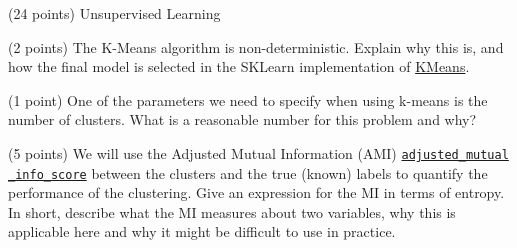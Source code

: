\documentclass[12pt]{article}
\begin{document}

\begin{question}{\label{Q_UNSUP_LEARN}(24 points) Unsupervised Learning}




\begin{subquestion}{(2 points) The K-Means algorithm is non-deterministic. Explain why this is, and how the final model is selected in the SKLearn implementation of \href{https://scikit-learn.org/stable/modules/clustering.html}{KMeans}.}






\end{subquestion}


\begin{subquestion}{(1 point) One of the parameters we need to specify when using k-means is the number of clusters. What is a reasonable number for this problem and why?}






\end{subquestion}


\begin{subquestion}{(5 points) We will use the Adjusted Mutual Information (AMI) \ie \href{https://scikit-learn.org/stable/modules/clustering.html\#mutual-info-score}{\texttt{adjusted\_mutual\\\_info\_score}} between the clusters and the true (known) labels to quantify the performance of the clustering. Give an expression for the MI in terms of entropy. In short, describe what the MI measures about two variables, why this is applicable here and why it might be difficult to use in practice. }






\end{subquestion}


\end{question}
\end{document}
